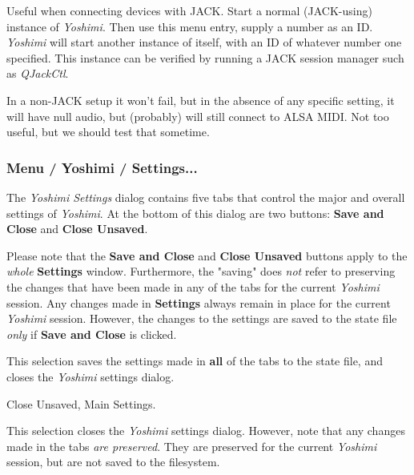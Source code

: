    Useful when connecting devices with JACK.
   Start a normal (JACK-using) instance of \textsl{Yoshimi}.
   Then use this menu entry, supply a number as an ID.
   \textsl{Yoshimi} will start another instance
   of itself, with an ID of whatever number one specified.
   This instance can be verified by running a JACK session manager such as
   \textsl{QJackCtl}.

   In a non-JACK setup it won't fail, but in the absence of any specific
   setting, it will have null audio, but (probably) will still connect to ALSA
   MIDI.  Not too useful, but we should test that sometime.

\subsubsection{Menu / Yoshimi / Settings...}
\label{subsubsec:menu_yoshimi_settings}

   The \textsl{Yoshimi Settings} dialog contains five tabs that control the
   major and overall settings of \textsl{Yoshimi}.  At the bottom of this
   dialog are two buttons:
   \textbf{Save and Close} and \textbf{Close Unsaved}.

   Please note that the \textbf{Save and Close} and \textbf{Close Unsaved}
   buttons apply to the \textsl{whole}
   \textbf{Settings} window.
   Furthermore, the "saving" does \textsl{not} refer to preserving the changes
   that have been made
   in any of the tabs for the current \textsl{Yoshimi} session.  Any changes
   made in \textbf{Settings} always remain in place for the current
   \textsl{Yoshimi} session.
   However, the changes to the settings are saved to
   the state file \textsl{only} if \textbf{Save and Close} is clicked.

   \setcounter{ItemCounter}{0}      %

   This selection saves the settings made in \textbf{all} of the tabs to the
   state file, and closes the \textsl{Yoshimi} settings dialog.

   Close Unsaved, Main Settings.

   This selection closes the \textsl{Yoshimi} settings dialog.
   However, note that any changes made in the tabs
   \textsl{are preserved}.  They are preserved for the current
   \textsl{Yoshimi} session, but are not saved to the filesystem.

